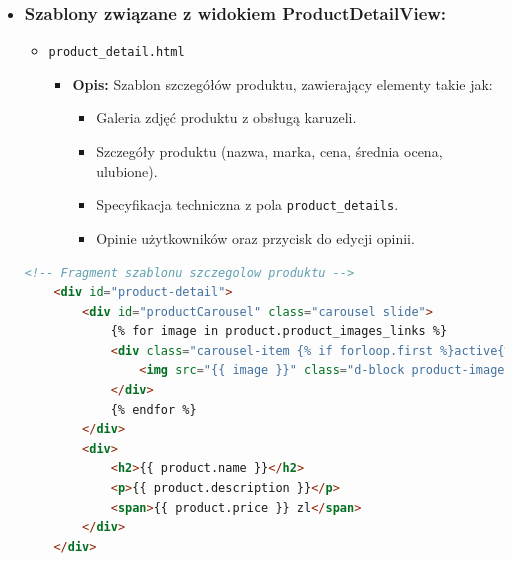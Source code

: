 \documentclass[12pt,a4paper,oneside]{article}
\theoremstyle{definition}
\numberwithin{equation}{section}
\begin{document}
\begin{itemize}
    \item \subsubsection{Szablony związane z widokiem ProductDetailView:}
        \begin{itemize}
            \item \texttt{product\_detail.html}
                \begin{itemize}
                    \item \textbf{Opis:} Szablon szczegółów produktu, zawierający elementy takie jak:
                    \begin{itemize}
                        \item Galeria zdjęć produktu z obsługą karuzeli.
                        \item Szczegóły produktu (nazwa, marka, cena, średnia ocena, ulubione).
                        \item Specyfikacja techniczna z pola \texttt{product\_details}.
                        \item Opinie użytkowników oraz przycisk do edycji opinii.
                    \end{itemize}
                \end{itemize}
        \end{itemize}
        \begin{lstlisting}[language=HTML, caption=Szablon \texttt{product\_detail.html}]
    <!-- Fragment szablonu szczegolow produktu -->
    <div id="product-detail">
        <div id="productCarousel" class="carousel slide">
            {% for image in product.product_images_links %}
            <div class="carousel-item {% if forloop.first %}active{% endif %}">
                <img src="{{ image }}" class="d-block product-image">
            </div>
            {% endfor %}
        </div>
        <div>
            <h2>{{ product.name }}</h2>
            <p>{{ product.description }}</p>
            <span>{{ product.price }} zl</span>
        </div>
    </div>
        \end{lstlisting}



\end{itemize}
\end{document}

